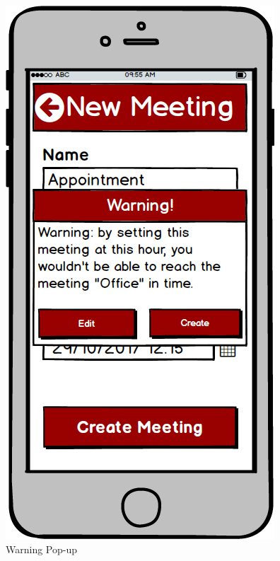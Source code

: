 \begin{figure}[!htb]
\begin{minipage}[b]{0.3\textwidth}
	\includegraphics[scale=0.3]{images/warning}
	\caption{Warning Pop-up}
	\label{ref:warning}
\end{minipage}
\end{figure}

